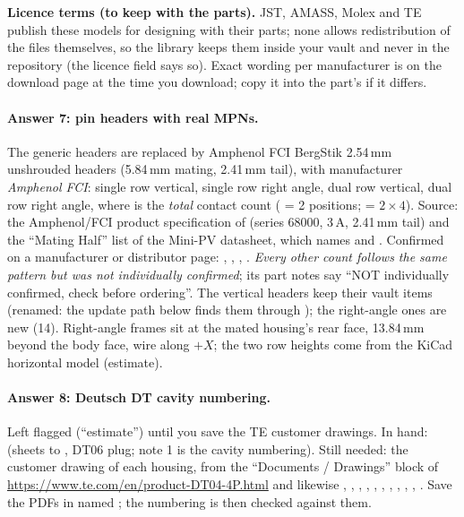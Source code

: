 \textbf{Licence terms (to keep with the parts).} JST, AMASS, Molex and TE publish these models for designing with
their parts; none allows redistribution of the files themselves, so the library keeps them inside your vault and
never in the repository (the licence field says so). Exact wording per manufacturer is on the download page at the
time you download; copy it into the part's  if it differs.

\paragraph{Answer 7: pin headers with real MPNs.} The generic  headers are replaced by
Amphenol FCI BergStik 2.54\,mm unshrouded headers (5.84\,mm mating, 2.41\,mm tail), with manufacturer
\emph{Amphenol FCI}:  single row vertical,  single row right angle,
 dual row vertical,  dual row right angle, where  is the \emph{total}
contact count ( = 2 positions;  = $2\times4$). Source: the Amphenol/FCI
product specification of  (series 68000, 3\,A, 2.41\,mm tail) and the ``Mating Half'' list of the
Mini-PV  datasheet, which names  and . Confirmed on a
manufacturer or distributor page: , , ,
. \emph{Every other count follows the same pattern but was not individually confirmed}; its part
notes say ``NOT individually confirmed, check before ordering''. The vertical headers keep their vault items
(renamed: the update path below finds them through ); the right-angle ones are new (14).
Right-angle frames sit at the mated housing's rear face, 13.84\,mm beyond the body face, wire along $+X$; the two row
heights come from the KiCad horizontal model (estimate).

\paragraph{Answer 8: Deutsch DT cavity numbering.} Left flagged (``estimate'') until you save the TE customer
drawings. In hand:  (sheets  to , DT06 plug; note 1 is the cavity
numbering). Still needed: the customer drawing of each housing, from the ``Documents / Drawings'' block of
\url{https://www.te.com/en/product-DT04-4P.html} and likewise , , , ,
, , , , , , . Save the PDFs in
 named ; the numbering is then
checked against them.

